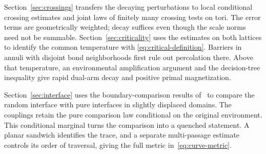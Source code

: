 Section~\ref{sec:crossings} transfers the decaying perturbations to local
conditional crossing estimates and joint laws of finitely many crossing
tests on tori. The error
terms are geometrically weighted; decay suffices even though the scale
norms need not be summable. Section~\ref{sec:criticality} uses the
estimates on both lattices to identify the common temperature with
\eqref{eq:critical-definition}. Barriers in annuli with disjoint bond
neighborhoods first rule out percolation there. Above that temperature,
an environmental amplification argument and the decision-tree inequality
give rapid dual-arm decay and positive primal magnetization.

Section~\ref{sec:interface} uses the boundary-comparison results
of~\cite{R,S} to compare the random interface with pure interfaces in
slightly displaced domains. The couplings retain the pure comparison
law conditional on the original environment. This conditional marginal
turns the comparison into a quenched statement. A planar sandwich
identifies the trace, and a separate multi-passage estimate controls
its order of traversal, giving the full metric
in~\eqref{eq:curve-metric}.
